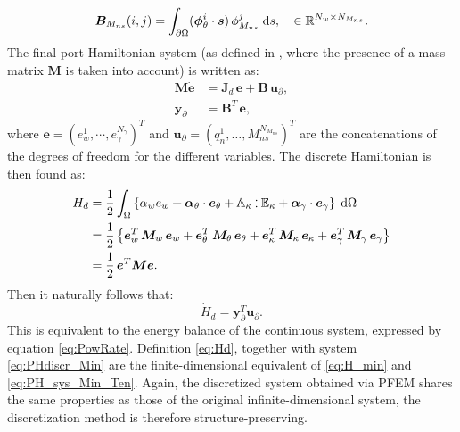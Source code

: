 \documentclass[11pt]{article}
\def\onedot{$\mathsurround0pt\ldotp$}
\def\cddot{%
	\mathbin{\vcenter{\baselineskip.67ex
			\hbox{\onedot}\hbox{\onedot}}%
}}
\begin{document}
{\begin{equation}
\begin{aligned}
		\bm{B}_{M_{ns}}(i,j) &= \int_{\partial\Omega} (\bm{\phi}_{\theta}^i \cdot \bm{s})\, \phi_{M_{ns}}^j \d{s}, \quad \in \mathbb{R}^{N_w \times N_{M_{ns}}}. \\
		\end{aligned}
		\end{equation}
		The final port-Hamiltonian system (as defined in \cite{beattie2018linear}, where the presence of a mass matrix $\bm{M}$ is taken into account) is written as:
		\begin{equation}
		\label{eq:PHdiscr_Min}
		\begin{aligned}
		\bm{M} \dot{\bm{e}} &= \bm{J}_d  \,\bm{e} + \bm{B} \, \bm{u}_{\partial}, \\
		\bm{y}_{\partial} &= \bm{B}^T \, \bm{e},
		\end{aligned} 
		\end{equation}
		where $\bm{e} = \left(e_w^1, \cdots, e_{\gamma}^{N_{\gamma}}\right)^T$ and $\bm{u}_{\partial} = \left(q_n^1, \dots, M_{ns}^{N_{M_{ns}}}\right)^T$ are the concatenations of the degrees of freedom for the different variables. The discrete Hamiltonian is then found as:
		\begin{equation}
		\label{eq:Hd}
		\begin{aligned}
		H_d &= \frac{1}{2} \int_{\Omega} \left\{ \alpha_w e_w + \bm{\alpha}_\theta \cdot \bm{e}_{\theta} + \mathbb{A}_{\kappa} \cddot \mathbb{E}_\kappa + \bm\alpha_{\gamma} \cdot \bm{e}_{\gamma}  \right\} \d\Omega \\
		&=  \frac{1}{2}  \left\{ \bm{e}_w^T \, \bm{M}_w \, \bm{e}_w + \bm{e}_\theta^T \, \bm{M}_\theta \, \bm{e}_\theta + \bm{e}_\kappa^T \, \bm{M}_\kappa \, \bm{e}_\kappa + \bm{e}_{\gamma}^T \, \bm{M}_{\gamma} \, \bm{e}_{\gamma}  \right\} \\
		&=  \frac{1}{2} \, \bm{e}^T  \bm{M}  \bm{e}.
		\end{aligned}
		\end{equation}
	}
	Then it naturally follows that:
	\begin{equation}
	\dot{H}_d = \bm{y}_{\partial}^T \bm{u}_{\partial}.
	\end{equation}
	This is equivalent to the energy balance of the continuous system, expressed by equation \eqref{eq:PowRate}. Definition \eqref{eq:Hd}, together with system \eqref{eq:PHdiscr_Min} are the finite-dimensional equivalent of \eqref{eq:H_min} and  \eqref{eq:PH_sys_Min_Ten}. Again, the discretized system obtained via PFEM shares the same properties as those of the original infinite-dimensional system, the discretization method is therefore structure-preserving. \\
	
\end{document}
